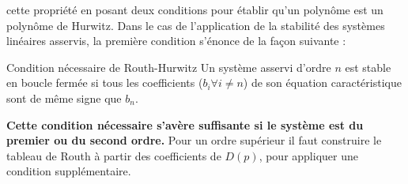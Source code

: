 cette propriété en posant deux conditions pour établir qu'un polynôme est 
un polynôme de Hurwitz. Dans le cas de l'application de la stabilité des 
systèmes linéaires asservis, la première condition s'énonce 
de la façon suivante :
\begin{criteria}{Condition nécessaire de Routh-Hurwitz }
    Un système asservi d'ordre $n$ est stable en boucle fermée 
    si tous les coefficients ($b_i\forall i\neq n$) de son équation 
    caractéristique sont de même signe que $b_n$.
\end{criteria}
\textbf{Cette condition nécessaire s'avère suffisante si le système est du 
premier ou du second ordre.} Pour un ordre supérieur il faut construire le 
tableau de Routh à partir des coefficients de $D(p)$,
pour appliquer une condition supplémentaire. 
